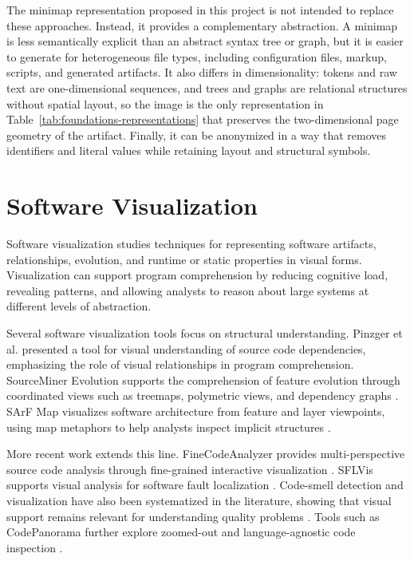 The minimap representation proposed in this project is not intended to replace
these approaches. Instead, it provides a complementary abstraction. A minimap is
less semantically explicit than an abstract syntax tree or graph, but it is
easier to generate for heterogeneous file types, including configuration files,
markup, scripts, and generated artifacts. It also differs in dimensionality:
tokens and raw text are one-dimensional sequences, and trees and graphs are
relational structures without spatial layout, so the image is the only
representation in Table~\ref{tab:foundations-representations} that preserves
the two-dimensional page geometry of the artifact. Finally, it can be
anonymized in a way that removes identifiers and literal values while retaining
layout and structural symbols.

\section{Software Visualization}

Software visualization studies techniques for representing software artifacts,
relationships, evolution, and runtime or static properties in visual forms.
Visualization can support program comprehension by reducing cognitive load,
revealing patterns, and allowing analysts to reason about large systems at
different levels of abstraction.

Several software visualization tools focus on structural understanding.
Pinzger et al. \cite{pinzger2008tool} presented a tool for visual understanding
of source code dependencies, emphasizing the role of visual relationships in
program comprehension. SourceMiner Evolution supports the comprehension of
feature evolution through coordinated views such as treemaps, polymetric views,
and dependency graphs \cite{novais2013sourceminer}. SArF Map visualizes software
architecture from feature and layer viewpoints, using map metaphors to help
analysts inspect implicit structures \cite{kobayashi2013sarf}.

More recent work extends this line. FineCodeAnalyzer provides
multi-perspective source code analysis through fine-grained interactive
visualization \cite{qayum2022finecodeanalyzer}. SFLVis supports visual analysis
for software fault localization \cite{sun2024sflvis}. Code-smell detection and
visualization have also been systematized in the literature, showing that visual
support remains relevant for understanding quality problems \cite{reis2022code}.
Tools such as CodePanorama further explore zoomed-out and language-agnostic code
inspection \cite{etter2022codepanorama}.

